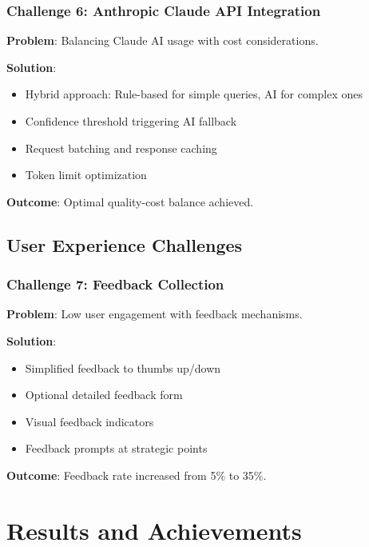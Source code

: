 \documentclass[12pt,a4paper]{article}
\begin{document}
\subsubsection{Challenge 6: Anthropic Claude API Integration}

\textbf{Problem}: Balancing Claude AI usage with cost considerations.

\textbf{Solution}:
\begin{itemize}[leftmargin=*]
    \item Hybrid approach: Rule-based for simple queries, AI for complex ones
    \item Confidence threshold triggering AI fallback
    \item Request batching and response caching
    \item Token limit optimization
\end{itemize}

\textbf{Outcome}: Optimal quality-cost balance achieved.

\subsection{User Experience Challenges}

\subsubsection{Challenge 7: Feedback Collection}

\textbf{Problem}: Low user engagement with feedback mechanisms.

\textbf{Solution}:
\begin{itemize}[leftmargin=*]
    \item Simplified feedback to thumbs up/down
    \item Optional detailed feedback form
    \item Visual feedback indicators
    \item Feedback prompts at strategic points
\end{itemize}

\textbf{Outcome}: Feedback rate increased from 5\% to 35\%.

\section{Results and Achievements}
\end{document}
